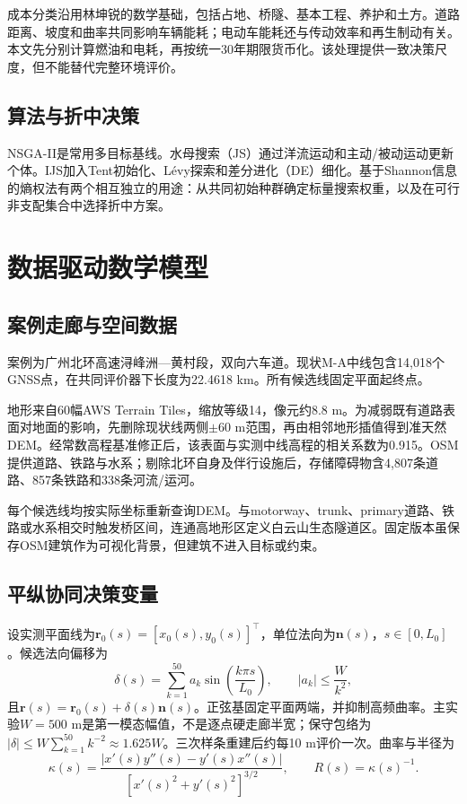 \documentclass[preprint,12pt]{elsarticle}
\begin{document}
成本分类沿用林坤锐\cite{lin2025}的数学基础，包括占地、桥隧、基本工程、养护和土方。道路距离、坡度和曲率共同影响车辆能耗\cite{llopis2019}；电动车能耗还与传动效率和再生制动有关\cite{dimartino2022}。本文先分别计算燃油和电耗，再按统一30年期限货币化。该处理提供一致决策尺度，但不能替代完整环境评价。

\subsection{算法与折中决策}

NSGA-II是常用多目标基线\cite{deb2002}。水母搜索（JS）通过洋流运动和主动/被动运动更新个体\cite{chou2021}。IJS加入Tent初始化、L\'evy探索和差分进化（DE）细化\cite{storn1997}。基于Shannon信息的熵权法\cite{shannon1948}有两个相互独立的用途：从共同初始种群确定标量搜索权重，以及在可行非支配集合中选择折中方案。

\section{数据驱动数学模型}\label{sec:model_zh}

\subsection{案例走廊与空间数据}

案例为广州北环高速浔峰洲—黄村段，双向六车道。现状M-A中线包含14,018个GNSS点，在共同评价器下长度为22.4618 km。所有候选线固定平面起终点。

地形来自60幅AWS Terrain Tiles，缩放等级14，像元约8.8 m\cite{awsterrain}。为减弱既有道路表面对地面的影响，先删除现状线两侧$\pm60$ m范围，再由相邻地形插值得到准天然DEM。经常数高程基准修正后，该表面与实测中线高程的相关系数为0.915。OSM提供道路、铁路与水系\cite{haklay2008,osmlicense}；剔除北环自身及伴行设施后，存储障碍物含4,807条道路、857条铁路和338条河流/运河。

每个候选线均按实际坐标重新查询DEM。与motorway、trunk、primary道路、铁路或水系相交时触发桥区间，连通高地形区定义白云山生态隧道区。固定版本虽保存OSM建筑作为可视化背景，但建筑不进入目标或约束。

\subsection{平纵协同决策变量}

设实测平面线为$\bm r_0(s)=[x_0(s),y_0(s)]^\top$，单位法向为$\bm n(s)$，$s\in[0,L_0]$。候选法向偏移为
\begin{equation}
\delta(s)=\sum_{k=1}^{50}a_k\sin\left(\frac{k\pi s}{L_0}\right),
\qquad |a_k|\leq\frac{W}{k^2},
\label{eq:sine_zh}
\end{equation}
且$\bm r(s)=\bm r_0(s)+\delta(s)\bm n(s)$。正弦基固定平面两端，并抑制高频曲率。主实验$W=500$ m是第一模态幅值，不是逐点硬走廊半宽；保守包络为$|\delta|\leq W\sum_{k=1}^{50}k^{-2}\approx1.625W$。三次样条重建后约每10 m评价一次。曲率与半径为
\begin{equation}
\kappa(s)=\frac{|x'(s)y''(s)-y'(s)x''(s)|}
{[x'(s)^2+y'(s)^2]^{3/2}},\qquad R(s)=\kappa(s)^{-1}.
\label{eq:curvature_zh}
\end{equation}
\end{document}
